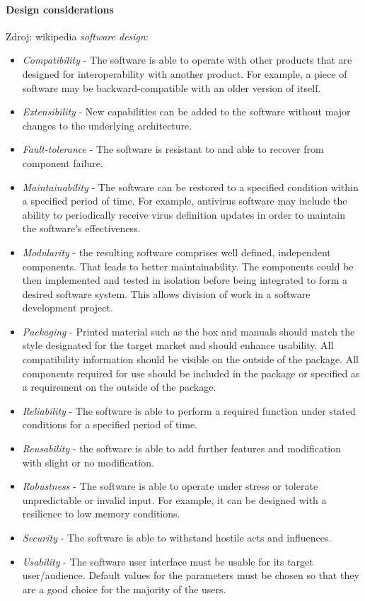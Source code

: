 \paragraph{Design considerations} Zdroj: wikipedia \emph{software design}:
\begin{itemize}
\item \emph{Compatibility} - The software is able to operate with other products that are designed for interoperability with another product. For example, a piece of software may be backward-compatible with an older version of itself.
\item \emph{Extensibility} - New capabilities can be added to the software without major changes to the underlying architecture.
\item \emph{Fault-tolerance} - The software is resistant to and able to recover from component failure.
\item \emph{Maintainability} - The software can be restored to a specified condition within a specified period of time. For example, antivirus software may include the ability to periodically receive virus definition updates in order to maintain the software's effectiveness.
\item \emph{Modularity} - the resulting software comprises well defined, independent components. That leads to better maintainability. The components could be then implemented and tested in isolation before being integrated to form a desired software system. This allows division of work in a software development project.
\item \emph{Packaging} - Printed material such as the box and manuals should match the style designated for the target market and should enhance usability. All compatibility information should be visible on the outside of the package. All components required for use should be included in the package or specified as a requirement on the outside of the package.
\item \emph{Reliability} - The software is able to perform a required function under stated conditions for a specified period of time.
\item \emph{Reusability} - the software is able to add further features and modification with slight or no modification.
\item \emph{Robustness} - The software is able to operate under stress or tolerate unpredictable or invalid input. For example, it can be designed with a resilience to low memory conditions.
\item \emph{Security} - The software is able to withstand hostile acts and influences.
\item \emph{Usability} - The software user interface must be usable for its target user/audience. Default values for the parameters must be chosen so that they are a good choice for the majority of the users.
\end{itemize}

